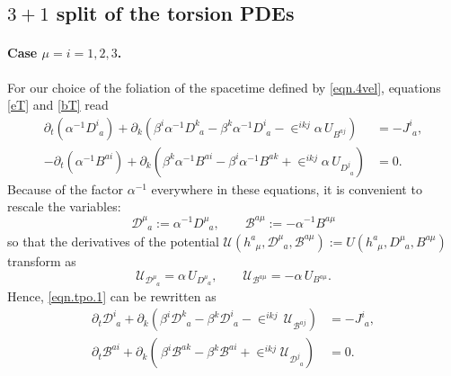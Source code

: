 \documentclass[
10pt, %
a4paper, %
oneside, %
headinclude,footinclude, %
BCOR5mm, %
]{scrartcl}
\newcommand{\IP}[1]{{\color{Red}[IP:\ \ #1]}}
\newcommand{\pd}[1]{\partial_{#1}}
\newcommand{\tetrsymbol}{h}
\newcommand{\tetr}[2]{\tetrsymbol^{#1}_{\phantom{#1}#2}}
\newcommand{\Dm}[2]{D_{\phantom{#2}#1}^{#2}}	%
\newcommand{\aD}[2]{\mathcal{D}_{\phantom{#2}#1}^{#2}}	%
\newcommand{\Bm}[2]{B^{#1#2}}	%
\newcommand{\aB}[2]{\mathcal{B}^{#1#2}}	%
\newcommand{\Um}{U}%
\newcommand{\aU}{\mathcal{U}}%
\newcommand{\LCsymb}{\bm{\in}}    %
\newcommand{\NC}[2]{J^{#2}_{\phantom{#2}#1}}
\newcommand{\lapse}{\alpha}
\newcommand{\shift}[1]{\beta^{#1}}
\begin{document}
\subsection{$ 3+1 $ split of the torsion PDEs}	\label{ssec.31.tors}


\paragraph{Case $ \mu = i=1,2,3 $.} 

For our choice of the foliation of the spacetime defined by \eqref{eqn.4vel}, equations \eqref{eT} 
and \eqref{bT} read
\begin{subequations}\label{eqn.tpo.1}
	\begin{align}
		\pd{t} (\lapse^{-1}\Dm{a}{i}) + \pd{k}(\shift{i} 
		\lapse^{-1}\Dm{a}{k} - \shift{k}\lapse^{-1}\Dm{a}{i}  - \LCsymb^{ikj} \lapse \,
		\Um_{\Bm{a}{j}}) & 
		= -\NC{a}{i}, \\[2mm]
%
		-\pd{t} (\lapse^{-1}\Bm{a}{i}) + \pd{k}(\shift{k} 
		\lapse^{-1}\Bm{a}{i} - \shift{i}\lapse^{-1}\Bm{a}{k}  + \LCsymb^{ikj} \lapse \,
		\Um_{\Dm{a}{j}}) & 
		= 0 .
	\end{align}
\end{subequations}
Because of the factor $ \alpha^{-1} $ everywhere in these equations, it is convenient to rescale 
the 
variables:
\begin{equation}\label{eqn.varDB}
	\aD{a}{\mu} := \lapse^{-1} \Dm{a}{\mu}, \qquad \aB{a}{\mu} := -\lapse^{-1}\Bm{a}{\mu}
\end{equation}
so that the derivatives of the potential $ \aU(\tetr{a}{\mu},\aD{a}{\mu},\aB{a}{\mu}) := 
\Um(\tetr{a}{\mu},\Dm{a}{\mu},\Bm{a}{\mu})
$ 
transform as
\begin{equation}\label{eqn.change.alphaU}
	\aU_{\aD{a}{\mu}} =  \lapse \, \Um_{\Dm{a}{\mu}},
	\qquad
	\aU_{\aB{a}{\mu}} = -\lapse \, \Um_{\Bm{a}{\mu}}.
\end{equation}
Hence, \eqref{eqn.tpo.1} can be rewritten as
\begin{subequations}\label{eqn.tpo.2}
	\begin{align}
	\pd{t} \aD{a}{i} + \pd{k}(\shift{i} 
	\aD{a}{k} - \shift{k}\aD{a}{i}  - \LCsymb^{ikj} \,
	\aU_{\aB{a}{j}}) & 
	= -\NC{a}{i},\\[2mm]
	\pd{t} \aB{a}{i} + \pd{k}(\,\shift{i} 
	\aB{a}{k} - \shift{k}\aB{a}{i}  + \LCsymb^{ikj} 
	\aU_{\aD{a}{j}}) & 
	= 0.
	\end{align}
\end{subequations}
\end{document}
